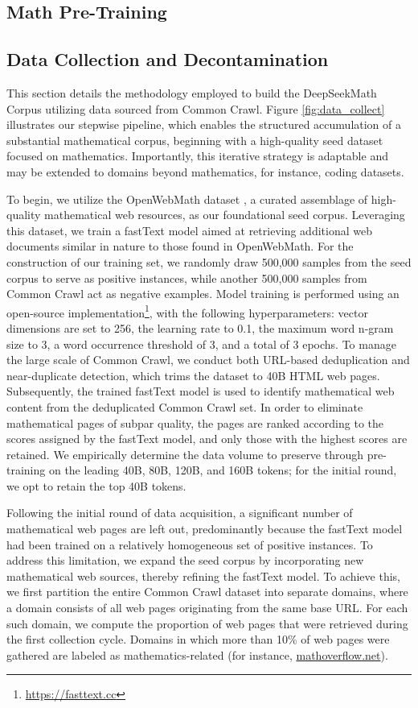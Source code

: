 \begin{itemize}[topsep=0pt]
\section{Math Pre-Training}

\subsection{Data Collection and Decontamination} This section details the methodology employed to build the DeepSeekMath Corpus utilizing data sourced from Common Crawl. Figure \ref{fig:data_collect} illustrates our stepwise pipeline, which enables the structured accumulation of a substantial mathematical corpus, beginning with a high-quality seed dataset focused on mathematics. Importantly, this iterative strategy is adaptable and may be extended to domains beyond mathematics, for instance, coding datasets.

To begin, we utilize the OpenWebMath dataset \citep{openwebmath}, a curated assemblage of high-quality mathematical web resources, as our foundational seed corpus. Leveraging this dataset, we train a fastText model \citep{joulin2016fasttext} aimed at retrieving additional web documents similar in nature to those found in OpenWebMath. For the construction of our training set, we randomly draw 500,000 samples from the seed corpus to serve as positive instances, while another 500,000 samples from Common Crawl act as negative examples. Model training is performed using an open-source implementation\footnote{\url{https://fasttext.cc}}, with the following hyperparameters: vector dimensions are set to 256, the learning rate to 0.1, the maximum word n-gram size to 3, a word occurrence threshold of 3, and a total of 3 epochs. To manage the large scale of Common Crawl, we conduct both URL-based deduplication and near-duplicate detection, which trims the dataset to 40B HTML web pages. Subsequently, the trained fastText model is used to identify mathematical web content from the deduplicated Common Crawl set. In order to eliminate mathematical pages of subpar quality, the pages are ranked according to the scores assigned by the fastText model, and only those with the highest scores are retained. We empirically determine the data volume to preserve through pre-training on the leading 40B, 80B, 120B, and 160B tokens; for the initial round, we opt to retain the top 40B tokens.

Following the initial round of data acquisition, a significant number of mathematical web pages are left out, predominantly because the fastText model had been trained on a relatively homogeneous set of positive instances. To address this limitation, we expand the seed corpus by incorporating new mathematical web sources, thereby refining the fastText model. To achieve this, we first partition the entire Common Crawl dataset into separate domains, where a domain consists of all web pages originating from the same base URL. For each such domain, we compute the proportion of web pages that were retrieved during the first collection cycle. Domains in which more than 10\% of web pages were gathered are labeled as mathematics-related (for instance, \url{mathoverflow.net}).


\end{itemize}
